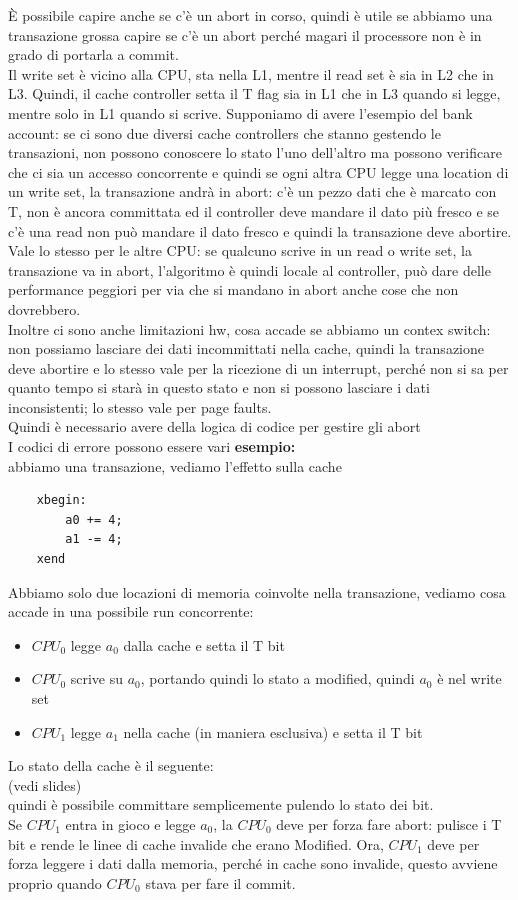 \documentclass[12pt, oneside]{extbook} %
\begin{document}
È possibile capire anche se c'è un abort in corso, quindi è utile se abbiamo una transazione grossa capire se c'è un abort perché magari il processore non è in grado di portarla a commit.\\ Il write set è vicino alla CPU, sta nella L1, mentre il read set è sia in L2 che in L3. Quindi, il cache controller setta il T flag sia in L1 che in L3 quando si legge, mentre solo in L1 quando si scrive. Supponiamo di avere l'esempio del bank account: se ci sono due diversi cache controllers che stanno gestendo le transazioni, non possono conoscere lo stato l'uno dell'altro ma possono verificare che ci sia un accesso concorrente e quindi se ogni altra CPU legge una location di un write set, la transazione andrà in abort: c'è un pezzo dati che è marcato con T, non è ancora committata ed il controller deve mandare il dato più fresco e se c'è una read non può mandare il dato fresco e quindi la transazione deve abortire.\\ Vale lo stesso per le altre CPU: se qualcuno scrive in un read o write set, la transazione va in abort, l'algoritmo è quindi locale al controller, può dare delle performance peggiori per via che si mandano in abort anche cose che non dovrebbero. \\Inoltre ci sono anche limitazioni hw, cosa accade se abbiamo un contex switch: non possiamo lasciare dei dati incommittati nella cache, quindi la transazione deve abortire e lo stesso vale per la ricezione di un interrupt, perché non si sa per quanto tempo si starà in questo stato e non si possono lasciare i dati inconsistenti; lo stesso vale per page faults.\\ Quindi è necessario avere della logica di codice per gestire gli abort\\ I codici di errore possono essere vari
\textbf{esempio:}\\ abbiamo una transazione, vediamo l'effetto sulla cache
\begin{lstlisting}
	xbegin:
		a0 += 4;
		a1 -= 4;
	xend
\end{lstlisting}
Abbiamo solo due locazioni di memoria coinvolte nella transazione, vediamo cosa accade in una possibile run concorrente:
\begin{itemize}
\item $CPU_0$ legge $a_0$ dalla cache e setta il T bit
\item $CPU_0$ scrive su $a_0$, portando quindi lo stato a modified, quindi $a_0$ è nel write set
\item $CPU_1$ legge $a_1$ nella cache (in maniera esclusiva) e setta il T bit
\end{itemize}
Lo stato della cache è il seguente:\\
(vedi slides)\\
quindi è possibile committare semplicemente pulendo lo stato dei bit.\\ Se $CPU_1$ entra in gioco e legge $a_0$, la $CPU_0$ deve per forza fare abort: pulisce i T bit e rende le linee di cache invalide che erano Modified. Ora, $CPU_1$ deve per forza leggere i dati dalla memoria, perché in cache sono invalide, questo avviene proprio quando $CPU_0$ stava per fare il commit.
\end{document}
